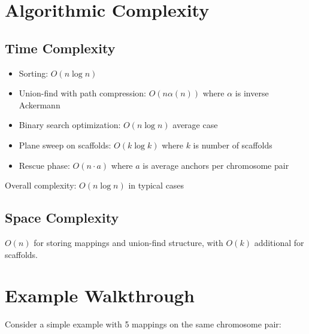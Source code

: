 \documentclass[11pt]{article}
\begin{document}
\section{Algorithmic Complexity}

\subsection{Time Complexity}

\begin{itemize}
    \item Sorting: $O(n \log n)$
    \item Union-find with path compression: $O(n \alpha(n))$ where $\alpha$ is inverse Ackermann
    \item Binary search optimization: $O(n \log n)$ average case
    \item Plane sweep on scaffolds: $O(k \log k)$ where $k$ is number of scaffolds
    \item Rescue phase: $O(n \cdot a)$ where $a$ is average anchors per chromosome pair
\end{itemize}

Overall complexity: $O(n \log n)$ in typical cases

\subsection{Space Complexity}

$O(n)$ for storing mappings and union-find structure, with $O(k)$ additional for scaffolds.

\section{Example Walkthrough}

Consider a simple example with 5 mappings on the same chromosome pair:

\begin{center}
\end{center}
\end{document}
